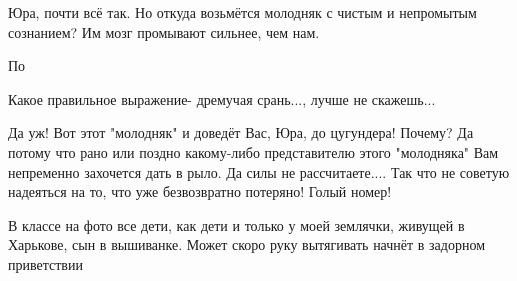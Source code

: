 \begin{itemize}
 
Юра, почти всё так. Но откуда возьмётся молодняк с чистым и непромытым сознанием? Им мозг промывают сильнее, чем нам.

 
По

 
Какое правильное выражение- дремучая срань..., лучше не скажешь...

 

Да уж! Вот этот "молодняк" и доведёт Вас, Юра, до цугундера! Почему? Да потому
что рано или поздно какому-либо представителю этого "молодняка" Вам непременно
захочется дать в рыло. Да силы не рассчитаете.... Так что не советую надеяться
на то, что уже безвозвратно потеряно! Голый номер!


 

В классе на фото все дети, как дети и только у моей землячки, живущей в Харькове,
сын в вышиванке. Может скоро руку вытягивать начнёт в задорном приветствии

 


\end{itemize}
